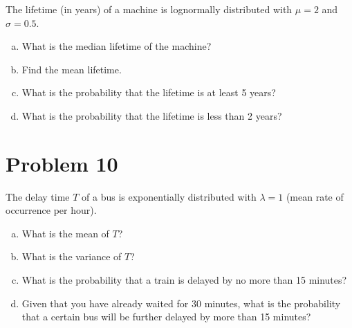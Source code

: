 \documentclass[12pt,twoside]{article}
\newcommand{\pts}[1]{\marginpar{ \small\hspace{0pt} \textit{[#1]} } }
\newcommand{\?}{\stackrel{?}{=}}
\newcommand{\gr}{\color{green!40!black}}
\newcommand{\la}{\lambda}
\begin{document}
The lifetime (in years) of a machine is lognormally distributed with 
$\mu = 2$ and $\sigma = 0.5$.
\begin{enumerate}[(a)]
  \item  What is the median lifetime of the machine? \pts{2}
  \vspace{10ex}

\item Find the mean lifetime.\pts{2}
  \vspace{25ex}
  
\item What is the probability that the lifetime is at least 5 years? \pts{3}
  \vspace{30ex}

\item What is the probability that the lifetime is less than 2 years? \pts{3}
  
\end{enumerate}

\eject

\section*{Problem 10 }
The delay time $T$ of a bus is exponentially distributed with $\la = 1$ (mean rate of occurrence per hour).


\begin{enumerate}[(a)]
\item What is the mean of $T$? \pts{1}
  \vspace{10ex}

\item What is the variance of $T$? \pts{1}
  \vspace{10ex}

  
\item What is the probability that a train is delayed by no more than 15 minutes? \pts{3}
  \vspace{25ex}
  
\item Given that you have already waited for 30 minutes, \pts{3}
   what is the probability that a certain bus will be further delayed by more than 15 minutes?
\end{enumerate}
\end{document}

